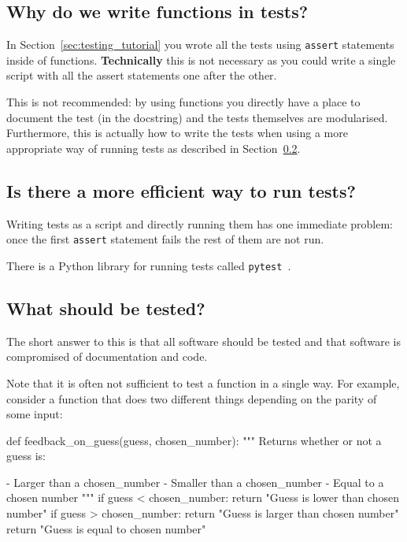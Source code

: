 \subsection{Why do we write functions in tests?}
\label{\detokenize{building-tools/07-testing/why/main:why-do-we-write-functions-in-tests}}

In Section~\ref{sec:testing_tutorial} you wrote all the tests using \texttt{assert} statements
inside of functions. \textbf{Technically} this is not necessary as you could write a
single script with all the assert statements one after the other.


This is not recommended: by using functions you directly have a place to document
the test (in the docstring) and the tests themselves are modularised.
Furthermore, this is actually how to write the tests when using a more
appropriate way of running tests as described in
Section~\ref{sec:is_there_a_more_efficient_way_to_run_tests}.


\subsection{Is there a more efficient way to run tests?}
\label{sec:is_there_a_more_efficient_way_to_run_tests}

Writing tests as a script and directly running them has one immediate problem:
once the first \texttt{assert} statement fails the rest of them are not run.


There is a Python library for running tests called
\texttt{pytest}~\cite{oliveira2018pytest}.

\subsection{What should be tested?}
\label{\detokenize{building-tools/07-testing/why/main:what-should-be-tested}}

The short answer to this is that all software should be tested and that software
is compromised of documentation and code.


Note that it is often not sufficient to test a function in a single way. For
example, consider a function that does two different things depending on the
parity of some input:

\begin{pyin}
def feedback_on_guess(guess, chosen_number):
    """
    Returns whether or not a guess is:

    - Larger than  a chosen_number
    - Smaller than a chosen_number
    - Equal to a chosen number
    """
    if guess < chosen_number:
        return "Guess is lower than chosen number"
    if guess > chosen_number:
        return "Guess is larger than chosen number"
    return "Guess is equal to chosen number"
\end{pyin}


